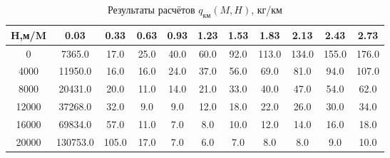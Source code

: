 \begin{table}[H]
\centering
\caption{Результаты расчётов $q_\text{км}(M,H)$, кг/км}
\label{nx}
\begin{tabular}{|c|c|c|c|c|c|c|c|c|c|c|}
\toprule
H,м/M &      0.03 &   0.33 &  0.63 &  0.93 &  1.23 &  1.53 &   1.83 &   2.13 &   2.43 &   2.73 \\
\midrule
0     &    7365.0 &   17.0 &  25.0 &  40.0 &  60.0 &  92.0 &  113.0 &  134.0 &  155.0 &  176.0 \\
4000  &   11950.0 &   16.0 &  16.0 &  24.0 &  37.0 &  56.0 &   69.0 &   81.0 &   94.0 &  107.0 \\
8000  &   20431.0 &   20.0 &  11.0 &  14.0 &  21.0 &  33.0 &   40.0 &   47.0 &   54.0 &   62.0 \\
12000 &   37268.0 &   32.0 &   9.0 &   9.0 &  12.0 &  18.0 &   22.0 &   26.0 &   30.0 &   34.0 \\
16000 &   69834.0 &   57.0 &  11.0 &   7.0 &   8.0 &  10.0 &   12.0 &   14.0 &   16.0 &   18.0 \\
20000 &  130753.0 &  105.0 &  17.0 &   7.0 &   6.0 &   7.0 &    8.0 &    8.0 &    9.0 &   10.0 \\
\bottomrule
\end{tabular}
\end{table}
